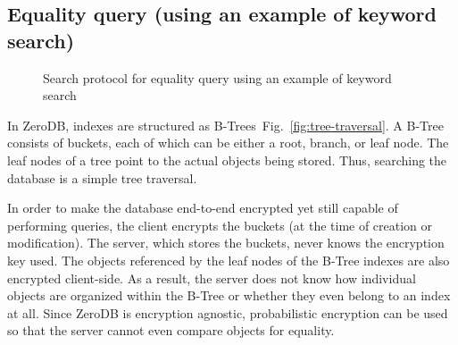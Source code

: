 \documentclass[notitlepage]{revtex4-1}
\newcommand{\figref}[1]{Fig.~\ref{#1}}
\begin{document}
\subsection{Equality query (using an example of keyword search)}
\begin{figure}
	\begin{center}
        \qquad
	\end{center}
    \caption{Search protocol for equality query using an example of keyword search}
	\label{fig:btree-protocol}
\end{figure}

In ZeroDB, indexes are structured as B-Trees~\figref{fig:tree-traversal}.
A B-Tree consists of buckets, each of which can be either a root, branch, or leaf node.
The leaf nodes of a tree point to the actual objects being stored.
Thus, searching the database is a simple tree traversal.

In order to make the database end-to-end encrypted yet still capable of performing queries, the client encrypts the buckets (at the time of creation or modification).
The server, which stores the buckets, never knows the encryption key used.
The objects referenced by the leaf nodes of the B-Tree indexes are also encrypted client-side.
As a result, the server does not know how individual objects are organized within the B-Tree or whether they even belong to an index at all.
Since ZeroDB is encryption agnostic, probabilistic encryption can be used so that the server cannot even compare objects for equality.
\end{document}
